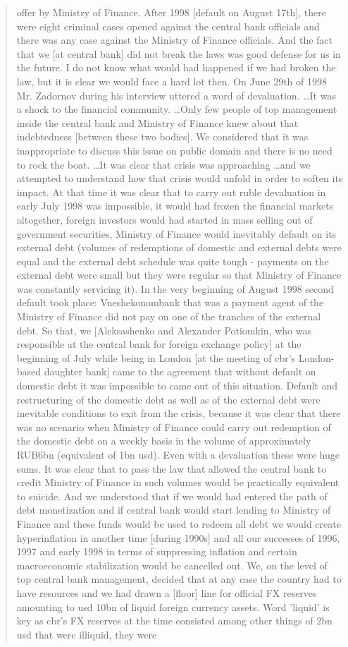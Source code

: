 \begin{quote}
offer by Ministry of Finance. After 1998 [default on August 17th], there were eight criminal cases opened against the central bank officials and there was any case against the Ministry of Finance officials. And the fact that we [at central bank] did not break the laws was good defense for us in the future. I do not know what would had happened if we had broken the law, but it is clear we would face a hard lot then. On June 29th of 1998 Mr. Zadornov during his interview uttered a word of devaluation. \dots It was a shock to the financial community. \dots Only few people of top management inside the central bank and Ministry of Finance knew about that indebtedness [between these two bodies]. We considered that it was inappropriate to discuss this issue on public domain and there is no need to rock the boat. \dots It was clear that crisis was approaching \dots and we attempted to understand how that crisis would unfold in order to soften its impact. At that time it was clear that to carry out ruble devaluation in early July 1998 was impossible, it would had frozen the financial markets altogether, foreign investors would had started in mass selling out of government securities, Ministry of Finance would inevitably default on its external debt (volumes of redemptions of domestic and external debts were equal and the external debt schedule was quite tough - payments on the external debt were small but they were regular so that Ministry of Finance was constantly servicing it). In the very beginning of August 1998 second default took place: Vneshekonombank that was a payment agent of the Ministry of Finance did not pay on one of the tranches of the external debt. So that, we [Aleksashenko and Alexander Potiomkin, who was responsible at the central bank for foreign exchange policy] at the beginning of July while being in London [at the meeting of \ac{cbr}'s London-based daughter bank] came to the agreement that without default on domestic debt it was impossible to came out of this situation. Default and restructuring of the domestic debt as well as of the external debt were inevitable conditions to exit from the crisis, because it was clear that there was no scenario when Ministry of Finance could carry out redemption of the domestic debt on a weekly basis in the volume of approximately RUB6bn (equivalent of 1bn \ac{usd}). Even with a devaluation these were huge sums. It was clear that to pass the law that allowed the central bank to credit Ministry of Finance in such volumes would be practically equivalent to suicide. And we understood that if we would had entered the path of debt monetization and if central bank would start lending to Ministry of Finance and these funds would be used to redeem all debt we would create hyperinflation in another time [during 1990s] and all our successes of 1996, 1997 and early 1998 in terms of suppressing inflation and certain macroeconomic stabilization would be cancelled out. We, on the level of top central bank management, decided that at any case the country had to have resources and we had drawn a [floor] line for official FX reserves amounting to \ac{usd} 10bn of liquid foreign currency assets. Word 'liquid' is key as \ac{cbr}'s FX reserves at the time consisted among other things of 2bn \ac{usd} that were illiquid, they were 
\end{quote}
